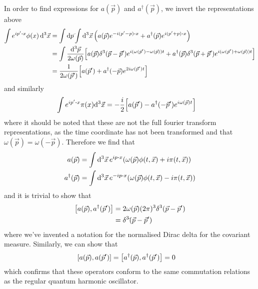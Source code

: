 \documentclass[notes.tex]{subfiles}
\begin{document}
In order to find expressions for $a(\vec{p})$ and $a^\dagger(\vec{p})$, we invert the representations above
\begin{align*}
    \int e^{ip^\prime\vdot x}\phi(x)\dd[3]{\vec{x}} &= \int \dds{p}\int \dd[3]{\vec{x}}\qty(a(\vec{p})e^{-i(p^\prime-p)\vdot x} + a^\dagger(\vec{p})e^{i(p^\prime+p)\vdot x})\\
    &= \int \frac{\dd[3]{\vec{p}}}{2\omega(\vec{p})}\qty[a(\vec{p}) \delta^3(\vec{p} - \vec{p}^\prime) e^{i(\omega(\vec{p}^\prime) - \omega(\vec{p}))t} + a^\dagger(\vec{p}) \delta^3(\vec{p} + \vec{p}^\prime) e^{i(\omega(\vec{p}^\prime) + \omega(\vec{p}))t}]\\
    &= \frac{1}{2\omega(\vec{p}^\prime)}\qty[a(\vec{p}^\prime) + a^\dagger(-\vec{p})e^{2i\omega(\vec{p}^\prime)t}]
\end{align*} 
and similarly
\begin{align*}
    \int e^{ip^\prime\vdot{x}}\pi(x)\dd[3]\vec{x} &= -\frac{i}{2}\qty[a(\vec{p}^\prime) - a^\dagger(-\vec{p}^\prime)e^{i\omega(\vec{p})t}]
\end{align*}
where it should be noted that these are not the full fourier transform representations, as the time coordinate has not been transformed and that $\omega(\vec{p}) = \omega(-\vec{p})$.
Therefore we find that
\begin{align*}
a(\vec{p}) &= \int\dd[3]{\vec{x}} e^{ip\vdot{x}} (\omega(\vec{p})\phi(t, \vec{x}) + i \pi(t, \vec{x}))\\
a^\dagger(\vec{p}) &= \int\dd[3]{\vec{x}} e^{-ip\vdot{x}} (\omega(\vec{p})\phi(t, \vec{x}) - i \pi(t, \vec{x})) 
\end{align*}
and it is trivial to show that
\begin{align*}
    \commutator{a(\vec{p})}{a^\dagger(\vec{p}^\prime)} &= 2\omega(\vec{p})(2\pi)^3 \delta^3(\vec{p}-\vec{p}^\prime)\\
    &= \deltaslash^3(\vec{p} - \vec{p}^\prime)
\end{align*}
where we've invented a notation for the normalised Dirac delta for the covariant measure. 
Similarly, we can show that \begin{align*}
    \commutator{a(\vec{p})}{a(\vec{p}^\prime)} &= \commutator{a^\dagger(\vec{p})}{a^\dagger(\vec{p}^\prime)}=0
\end{align*}
which confirms that these operators conform to the same commutation relations as the regular quantum harmonic oscillator.
\end{document}

